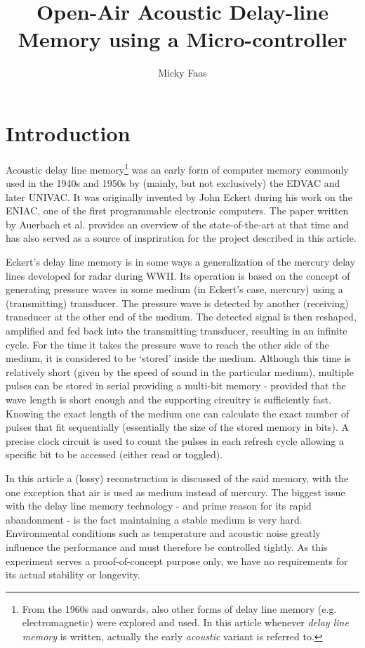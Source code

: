 \documentclass[10pt,a4paper,twocolumn]{article}
\author{Micky Faas}
\title{Open-Air Acoustic Delay-line Memory using a Micro-controller}
\begin{document}
\maketitle

\section{Introduction}
Acoustic delay line memory\footnote{From the 1960s and onwards, also other forms of delay line memory (e.g. electromagnetic) were explored and used. In this article whenever \emph{delay line memory} is written, actually the early \emph{acoustic} variant is referred to.} was an early form of computer memory commonly used in the 1940s and 1950s by (mainly, but not exclusively) the EDVAC and later UNIVAC. It was originally invented by John Eckert during his work on the ENIAC, one of the first programmable electronic computers. The paper written by Auerbach et al.\cite{auerbach} provides an overview of the state-of-the-art at that time and has also served as a source of inspriration for the project described in this article.

Eckert's delay line memory is in some ways a generalization of the mercury delay lines developed for radar during WWII. Its operation is based on the concept of generating pressure waves in some medium (in Eckert's case, mercury) using a (transmitting) transducer. The pressure wave is detected by another (receiving) transducer at the other end of the medium. The detected signal is then reshaped, amplified and fed back into the transmitting transducer, resulting in an infinite cycle. For the time it takes the pressure wave to reach the other side of the medium, it is considered to be `stored' inside the medium. Although this time is relatively short (given by the speed of sound in the particular medium), multiple pulses can be stored in serial providing a multi-bit memory - provided that the wave length is short enough and the supporting circuitry is sufficiently fast. Knowing the exact length of the medium one can calculate the exact number of pulses that fit sequentially (essentially the size of the stored memory in bits). A precise clock circuit is used to count the pulses in each refresh cycle allowing a specific bit to be accessed (either read or toggled). 

In this article a (lossy) reconstruction is discussed of the said memory, with the one exception that air is used as medium instead of mercury. The biggest issue with the delay line memory technology - and prime reason for its rapid abandonment - is the fact maintaining a stable medium is very hard. Environmental conditions such as temperature and acoustic noise greatly influence the performance and must therefore be controlled tightly. As this experiment serves a proof-of-concept purpose only, we have no requirements for its actual stability or longevity. 
\end{document}
